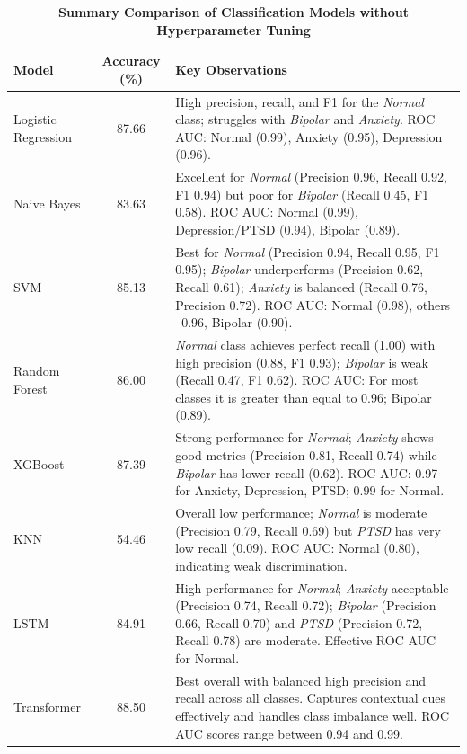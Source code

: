 \pagebreak

\begin{table}[H]
    \centering
    \renewcommand{\arraystretch}{1.2}
    \small
    \begin{tabularx}{\textwidth}{|l|c|X|}
    \hline
    \textbf{Model} & \textbf{Accuracy (\%)} & \textbf{Key Observations} \\
    \hline
    Logistic Regression & 87.66 & High precision, recall, and F1 for the \textit{Normal} class; struggles with \textit{Bipolar} and \textit{Anxiety}. ROC AUC: Normal (0.99), Anxiety (0.95), Depression (0.96). \\
    \hline
    Naive Bayes & 83.63 & Excellent for \textit{Normal} (Precision 0.96, Recall 0.92, F1 0.94) but poor for \textit{Bipolar} (Recall 0.45, F1 0.58). \newline ROC AUC: Normal (0.99), Depression/PTSD (0.94), Bipolar (0.89). \\
    \hline
    SVM & 85.13 & Best for \textit{Normal} (Precision 0.94, Recall 0.95, F1 0.95); \textit{Bipolar} underperforms (Precision 0.62, Recall 0.61); \textit{Anxiety} is balanced (Recall 0.76, Precision 0.72). \newline ROC AUC: Normal (0.98), others ~0.96, Bipolar (0.90). \\
    \hline
    Random Forest & 86.00 & \textit{Normal} class achieves perfect recall (1.00) with high precision (0.88, F1 0.93); \textit{Bipolar} is weak (Recall 0.47, F1 0.62). \newline ROC AUC: For most classes it is greater than equal to 0.96; Bipolar (0.89). \\
    \hline
    XGBoost & 87.39 & Strong performance for \textit{Normal}; \textit{Anxiety} shows good metrics (Precision 0.81, Recall 0.74) while \textit{Bipolar} has lower recall (0.62). \newline ROC AUC: 0.97 for Anxiety, Depression, PTSD; 0.99 for Normal. \\
    \hline
    KNN & 54.46 & Overall low performance; \textit{Normal} is moderate (Precision 0.79, Recall 0.69) but \textit{PTSD} has very low recall (0.09). \newline ROC AUC: Normal (0.80), indicating weak discrimination. \\
    \hline
    LSTM & 84.91 & High performance for \textit{Normal}; \textit{Anxiety} acceptable (Precision 0.74, Recall 0.72); \textit{Bipolar} (Precision 0.66, Recall 0.70) and \textit{PTSD} (Precision 0.72, Recall 0.78) are moderate. \newline Effective ROC AUC for Normal. \\
    \hline
    Transformer & 88.50 & Best overall with balanced high precision and recall across all classes. Captures contextual cues effectively and handles class imbalance well. \newline ROC AUC scores range between 0.94 and 0.99. \\
    \hline
    \end{tabularx}
    \caption*{\textbf{Summary Comparison of  Classification Models without Hyperparameter Tuning}}
    \label{tab:model_comparison}
\end{table}



